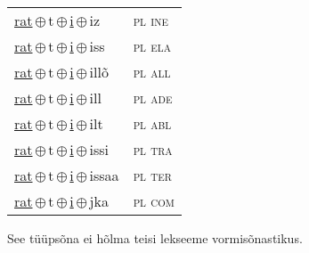 \begin{minipage}{\textwidth}
\begin{sideways}
\begin{tabular}{l l}
\underline{rat}\,$\oplus$\,t\,$\oplus$\,\underline{i}\,$\oplus$\,iz & \textsc{ pl ine } \\
\underline{rat}\,$\oplus$\,t\,$\oplus$\,\underline{i}\,$\oplus$\,iss & \textsc{ pl ela } \\
\underline{rat}\,$\oplus$\,t\,$\oplus$\,\underline{i}\,$\oplus$\,illõ & \textsc{ pl all } \\
\underline{rat}\,$\oplus$\,t\,$\oplus$\,\underline{i}\,$\oplus$\,ill & \textsc{ pl ade } \\
\underline{rat}\,$\oplus$\,t\,$\oplus$\,\underline{i}\,$\oplus$\,ilt & \textsc{ pl abl } \\
\underline{rat}\,$\oplus$\,t\,$\oplus$\,\underline{i}\,$\oplus$\,issi & \textsc{ pl tra } \\
\underline{rat}\,$\oplus$\,t\,$\oplus$\,\underline{i}\,$\oplus$\,issaa & \textsc{ pl ter } \\
\underline{rat}\,$\oplus$\,t\,$\oplus$\,\underline{i}\,$\oplus$\,jka & \textsc{ pl com } \\
\end{tabular}
\end{sideways}
\label{tab:tüüpsõnamall-ratiz}

\end{minipage}

 
\vspace{1em}
\noindent See tüüpsõna ei hõlma teisi lekseeme vormi\-sõnastikus.
